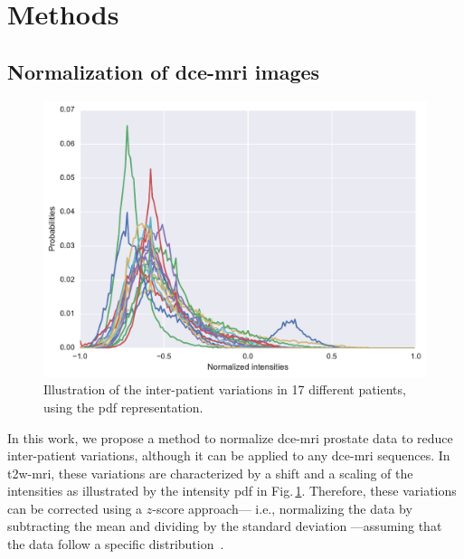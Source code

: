 \section{Methods}\label{sec:method}

\subsection{Normalization of \ac{dce}-\ac{mri} images}\label{sec:norm}

\begin{figure}
  \centering
  \includegraphics[width=0.7\linewidth]{02_methods/figures/t2w.pdf}
  \caption{Illustration of the inter-patient variations in 17 different patients, using the \acs*{pdf} representation.}
  \label{fig:t2w}
\end{figure}

In this work, we propose a method to normalize \ac{dce}-\ac{mri} prostate data to reduce inter-patient variations, although it can be applied to any \ac{dce}-\ac{mri} sequences.
In \ac{t2w}-\ac{mri}, these variations are characterized by a shift and a scaling of the intensities as illustrated by the intensity \ac{pdf} in Fig.\,\ref{fig:t2w}.
Therefore, these variations can be corrected using a $z$-score approach--- i.e., normalizing the data by subtracting the mean and dividing by the standard deviation ---assuming that the data follow a specific distribution~\citep{lemaitre2016normalization}.

